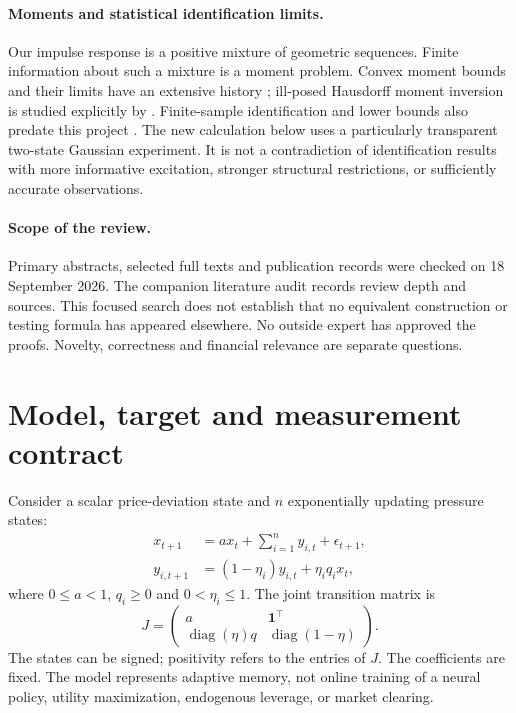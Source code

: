 \documentclass[11pt]{article}
\theoremstyle{remark}\newtheorem{remark}[proposition]{Remark}
\begin{document}
\paragraph{Moments and statistical identification limits.}
Our impulse response is a positive mixture of geometric sequences. Finite information about such a mixture is a moment problem. Convex moment bounds and their limits have an extensive history \citep{bertsimas2005}; ill-posed Hausdorff moment inversion is studied explicitly by \citet{gerth2021}. Finite-sample identification and lower bounds also predate this project \citep{oymak2019,jedra2019}. The new calculation below uses a particularly transparent two-state Gaussian experiment. It is not a contradiction of identification results with more informative excitation, stronger structural restrictions, or sufficiently accurate observations.

\paragraph{Scope of the review.}
Primary abstracts, selected full texts and publication records were checked on 18 September 2026. The companion literature audit records review depth and sources. This focused search does not establish that no equivalent construction or testing formula has appeared elsewhere. No outside expert has approved the proofs. Novelty, correctness and financial relevance are separate questions.

\section{Model, target and measurement contract}\label{sec:model}
Consider a scalar price-deviation state and $n$ exponentially updating pressure states:
\begin{align}
 x_{t+1}&=a x_t+\sum_{i=1}^n y_{i,t}+\epsilon_{t+1},\\
 y_{i,t+1}&=(1-\eta_i)y_{i,t}+\eta_i q_i x_t,
\end{align}
where $0\le a<1$, $q_i\ge0$ and $0<\eta_i\le1$. The joint transition matrix is
\begin{equation}
 J=\begin{pmatrix}a&\mathbf 1^\top\\\operatorname{diag}(\eta)q&\operatorname{diag}(1-\eta)\end{pmatrix}.
\end{equation}
The states can be signed; positivity refers to the entries of $J$. The coefficients are fixed. The model represents adaptive memory, not online training of a neural policy, utility maximization, endogenous leverage, or market clearing.
\end{document}

